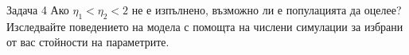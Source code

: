 \begin{frame}[t]{Задача 4}
Ако $\eta_{1} < \eta_{2} < 2$ не е изпълнено, възможно ли е популацията да оцелее? Изследвайте поведението на модела с помощта на числени симулации за
избрани от вас стойности на параметрите.
\end{frame}